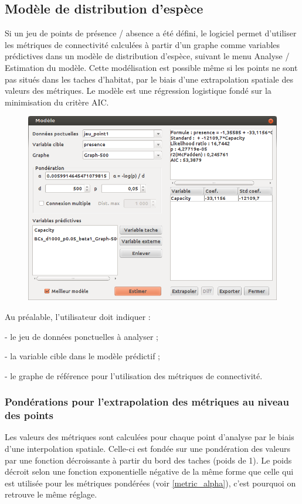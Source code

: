 \documentclass{article}
\begin{document}
\subsection{Modèle de distribution d’espèce}
\label{sdm}

Si un jeu de points de présence / absence a été défini, le logiciel permet d’utiliser les métriques de connectivité calculées à partir d’un graphe comme variables prédictives dans un modèle de distribution d’espèce, suivant le menu Analyse / Estimation du modèle. Cette modélisation est possible même si les points ne sont pas situés dans les taches d’habitat, par le biais d’une extrapolation spatiale des valeurs des métriques. Le modèle est une régression logistique fondé sur la minimisation du critère AIC.

\begin{figure}[H]
	\includegraphics[scale=0.5]{img/manual-fr_img15.png} 
\end{figure}

Au préalable, l’utilisateur doit indiquer :

{}- le jeu de données ponctuelles à analyser ;

{}- la variable cible dans le modèle prédictif ;

{}- le graphe de référence pour l’utilisation des métriques de connectivité.

\subsubsection{Pondérations pour l’extrapolation des métriques au niveau des points}
Les valeurs des métriques sont calculées pour chaque point d’analyse par le biais d’une interpolation spatiale. Celle-ci est fondée sur une pondération des valeurs par une fonction décroissante à partir du bord des taches (poids de 1). Le poids décroit selon une fonction exponentielle négative de la même forme que celle qui est utilisée pour les métriques pondérées (voir \ref{metric_alpha}), c’est pourquoi on retrouve le même réglage.
\end{document}
